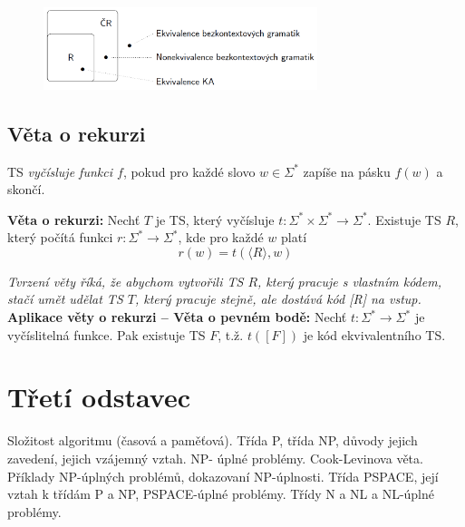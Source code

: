 \documentclass[10pt,a4paper]{article}
\theoremstyle{note}
\begin{document}
		\begin{figure}[!h]
		\centering
		\includegraphics[width=8cm]{img/chomskyVSts.png}
		\end{figure}

	\subsection{Věta o rekurzi}

		TS \textit{vyčísluje funkci $f$}, pokud pro každé slovo $w \in \Sigma^{*}$ zapíše na pásku $f(w)$ a skončí.
		\vspace{5mm}

		\textbf{Věta o rekurzi: }Nechť $T$ je TS, který vyčísluje
			$t : \Sigma^{*} \times \Sigma^{*} \rightarrow \Sigma^{*}$. Existuje TS $R$, který
		počítá funkci $ r : \Sigma^{*} \rightarrow \Sigma^{*}$, kde pro každé $w$ platí $$r(w) = t(\langle R \rangle,w)$$

		\textit{Tvrzení věty říká, že abychom vytvořili TS $R$, který pracuje s vlastním kódem, stačí umět udělat
			 TS $T$, který pracuje stejně, ale dostává kód [R] na vstup. }\\

		\vspace{5mm}
		\textbf{Aplikace věty o rekurzi -- Věta o pevném bodě:}
		Nechť $t : \Sigma^{*} \rightarrow \Sigma^{*}$ je vyčíslitelná funkce. Pak existuje TS $F$, t.ž. $t([F])$ je kód
		ekvivalentního TS.


\section{Třetí odstavec}

Složitost algoritmu (časová a paměťová). Třída P, třída NP, důvody jejich zavedení, jejich vzájemný vztah. NP-
úplné problémy. Cook-Levinova věta. Příklady NP-úplných problémů, dokazovaní NP-úplnosti. Třída PSPACE,
její vztah k třídám P a NP, PSPACE-úplné problémy. Třídy N a NL a NL-úplné problémy.
\end{document}
